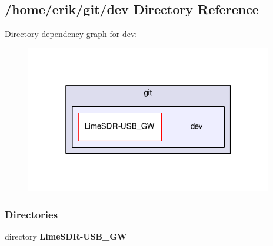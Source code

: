 \subsection{/home/erik/git/dev Directory Reference}
\label{dir_3e08df7f4a326174d106c21c2cccc519}
Directory dependency graph for dev\+:
\nopagebreak
\begin{figure}[H]
\begin{center}
\leavevmode
\includegraphics[width=306pt]{dir_3e08df7f4a326174d106c21c2cccc519_dep}
\end{center}
\end{figure}
\subsubsection*{Directories}
\begin{DoxyCompactItemize}
\item 
directory {\bf Lime\+S\+D\+R-\/\+U\+S\+B\+\_\+\+GW}
\end{DoxyCompactItemize}

